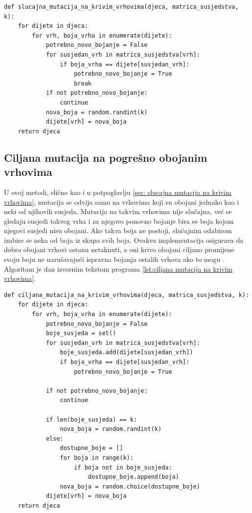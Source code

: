 \documentclass[times, utf8, zavrsni, numeric]{fer}
\begin{document}
\begin{lstlisting}[caption=Slučajna mutacija na pogrešno obojanim vrhovima, label={lst:slucajna mutacija na krivim vrhovima}]
def slucajna_mutacija_na_krivim_vrhovima(djeca, matrica_susjedstva, k):
    for dijete in djeca:
        for vrh, boja_vrha in enumerate(dijete):
            potrebno_novo_bojanje = False
            for susjedan_vrh in matrica_susjedstva[vrh]:
                if boja_vrha == dijete[susjedan_vrh]:
                    potrebno_novo_bojanje = True
                    break
            if not potrebno_novo_bojanje:
                continue
            nova_boja = random.randint(k)
            dijete[vrh] = nova_boja
    return djeca
\end{lstlisting}

\subsection{Ciljana mutacija na pogrešno obojanim vrhovima}
\label{sec: ciljana mutacija na krivim vrhovima}
U ovoj metodi, slično kao i u potpoglavlju \ref{sec: slucajna mutacija na krivim vrhovima}, mutacija se odvija samo na vrhovima koji su obojani jednako kao i neki od njihovih susjeda. Mutacija na takvim vrhovima nije slučajna, već se gledaju susjedi takvog vrha i za njegovo ponovno bojanje bira se boja kojom njegovi susjedi nisu obojani. Ako takva boja ne postoji, slučajnim odabirom izabire se neka od boja iz skupa svih boja. Ovakva implementacija osigurava da dobro obojani vrhovi ostanu netaknuti, a oni krivo obojani ciljano promijene svoju boju ne narušavajući ispravna bojanja ostalih vrhova ako to mogu \cite{hindi2012genetic}. Algoritam je dan izvornim tekstom programa \ref{lst:ciljana mutacija na krivim vrhovima}.

\begin{lstlisting}[caption=Ciljana mutacija na pogrešno obojanim vrhovima, label={lst:ciljana mutacija na krivim vrhovima}]
def ciljana_mutacija_na_krivim_vrhovima(djeca, matrica_susjedstva, k):
    for dijete in djeca:
        for vrh, boja_vrha in enumerate(dijete):
            potrebno_novo_bojanje = False
            boje_susjeda = set()
            for susjedan_vrh in matrica_susjedstva[vrh]:
                boje_susjeda.add(dijete[susjedan_vrh])
                if boja_vrha == dijete[susjedan_vrh]:
                    potrebno_novo_bojanje = True
            
            if not potrebno_novo_bojanje:
                continue

            if len(boje_susjeda) == k:
                nova_boja = random.randint(k)
            else:
                dostupne_boje = []
                for boja in range(k):
                    if boja not in boje_susjeda:
                        dostupne_boje.append(boja)
                nova_boja = random.choice(dostupne_boje)
            dijete[vrh] = nova_boja
    return djeca
\end{lstlisting}
\end{document}

